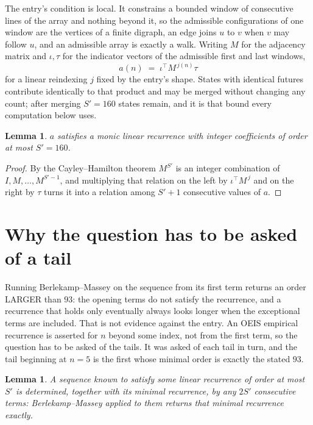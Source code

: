 \documentclass[11pt,a4paper]{article}
\theoremstyle{plain}
\newtheorem{lemma}[theorem]{Lemma}
\theoremstyle{definition}
\begin{document}
The entry's condition is local. It constrains a bounded window of consecutive lines of the
array and nothing beyond it, so the admissible configurations of one window are the vertices of
a finite digraph, an edge joins $u$ to $v$ when $v$ may follow $u$, and an admissible array is
exactly a walk. Writing $M$ for the adjacency matrix and $\iota,\tau$ for the indicator vectors
of the admissible first and last windows,
\[
a(n)\;=\;\iota^{\!\top}M^{\,j(n)}\tau
\]
for a linear reindexing $j$ fixed by the entry's shape. States with identical futures
contribute identically to that product and may be merged without changing any count; after
merging $S'=160$ states remain, and it is that bound every computation below uses.

\begin{lemma}\label{lem:cf}
$a$ satisfies a monic linear recurrence with integer coefficients of order at most $S'=160$.
\end{lemma}

\begin{proof}
By the Cayley--Hamilton theorem $M^{S'}$ is an integer combination of $I,M,\dots,M^{S'-1}$,
and multiplying that relation on the left by $\iota^{\!\top}M^{\,j}$ and on the right by
$\tau$ turns it into a relation among $S'+1$ consecutive values of $a$.
\end{proof}

\section{Why the question has to be asked of a tail}

Running Berlekamp--Massey on the sequence from its first term returns an order LARGER than $93$: the opening terms do not satisfy the recurrence, and a recurrence that holds only eventually always looks longer when the exceptional terms are included. That is not evidence against the entry. An OEIS empirical recurrence is asserted for $n$ beyond some index, not from the first term, so the question has to be asked of the tails. It was asked of each tail in turn, and the tail beginning at $n=5$ is the first whose minimal order is exactly the stated $93$.

\begin{lemma}\label{lem:bm}
A sequence known to satisfy some linear recurrence of order at most $S'$ is determined,
together with its minimal recurrence, by any $2S'$ consecutive terms: Berlekamp--Massey applied
to them returns that minimal recurrence exactly.
\end{lemma}
\end{document}
